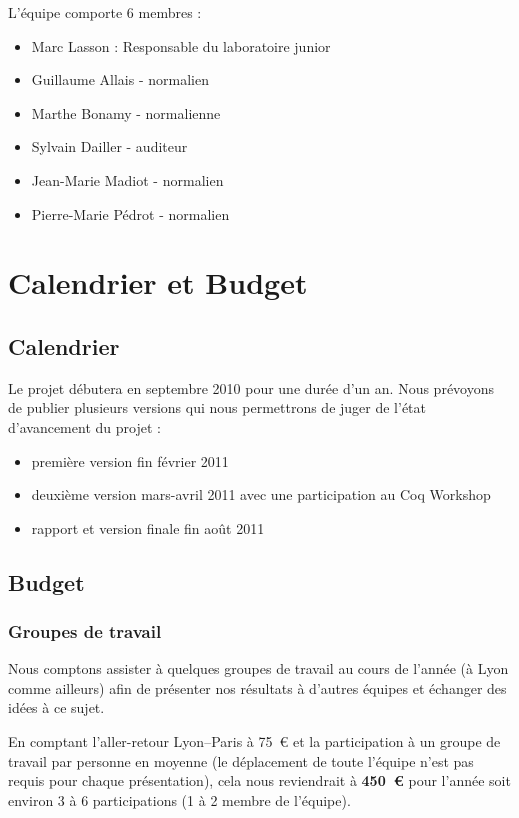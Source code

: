 \documentclass[11pt]{article}
\begin{document}
L'équipe comporte 6 membres :

\begin{itemize}
 \item Marc Lasson : Responsable du laboratoire junior
 \item Guillaume Allais - normalien
 \item Marthe Bonamy - normalienne
 \item Sylvain Dailler - auditeur
 \item Jean-Marie Madiot - normalien
 \item Pierre-Marie Pédrot - normalien
\end{itemize}

\section{Calendrier et Budget}

\subsection{Calendrier}

Le projet débutera en septembre 2010 pour une durée d'un an.
Nous prévoyons de publier plusieurs versions qui nous permettrons de juger de l'état d'avancement du projet : 
\begin{itemize}
 \item première version fin février 2011
 \item deuxième version mars-avril 2011 avec une participation au Coq Workshop
 \item rapport et version finale fin août 2011
\end{itemize}

\subsection{Budget}

\subsubsection{Groupes de travail}

Nous comptons assister à quelques groupes de travail au cours de l'année (à Lyon comme ailleurs) afin de présenter nos résultats à d'autres équipes et échanger des idées à ce sujet. 

En comptant l'aller-retour Lyon--Paris à 75~€ et la participation à un groupe de travail par personne en moyenne (le déplacement de toute l'équipe n'est pas requis pour chaque présentation), cela nous reviendrait à \textbf{450~€} pour l'année soit environ 3 à 6 participations (1 à 2 membre de l'équipe).
\end{document}
